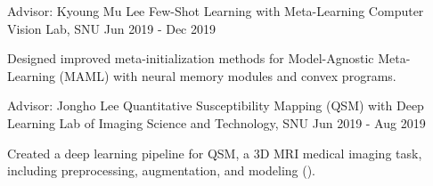 \begin{cventries}
  \cventryexp
    {Advisor: Kyoung Mu Lee}
    {Few-Shot Learning with Meta-Learning}
    {Computer Vision Lab, SNU}
    {Jun 2019 - Dec 2019}
    {
      \begin{cvitems}
        \item {Designed improved meta-initialization methods for Model-Agnostic Meta-Learning (MAML) with neural memory modules and convex programs.}
      \end{cvitems}
    }
    
  \cventryexp
    {Advisor: Jongho Lee}
    {Quantitative Susceptibility Mapping (QSM) with Deep Learning}
    {Lab of Imaging Science and Technology, SNU}
    {Jun 2019 - Aug 2019}
    {
      \begin{cvitems}
      \item {Created a deep learning pipeline for QSM, a 3D MRI medical imaging task, including preprocessing, augmentation, and modeling (\href{https://github.com/jaywonchung/CAD-QSMNet}{}).}
      \end{cvitems}
    }

\end{cventries}
